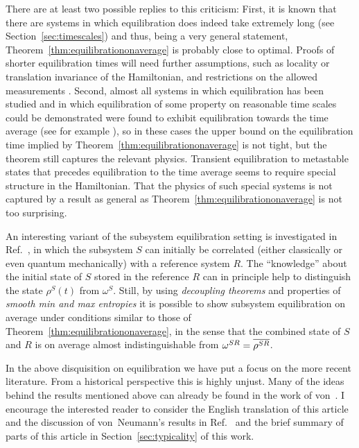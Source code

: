 \documentclass[a4paper,12pt,listof=totoc,index=totoc,bibliography=totoc,headsepline=false,headings=normal,BCOR16.153846mm,DIV12,headinclude,twoside,cleardoublepage=empty,numbers=noenddot,final]{scrreprt}
\theoremstyle{mystyle}
\numberwithin{equation}{section}
\numberwithin{figure}{section}
\numberwithin{lemma}{section}
\numberwithin{theorem}{section}
\numberwithin{corollary}{section}
\numberwithin{definition}{section}
\numberwithin{conjecture}{section}
\numberwithin{observation}{section}
\newcommand{\+}{\mkern2mu}
\newcommand{\taverage}[2][]{
  \ifthenelse{\equal{#1}{}}
  {\overline{#2}}
  {\overline{#2}^{#1}}
}
\DeclareMathOperator{\1}{\mathds{1}}
\begin{document}
There are at least two possible replies to this criticism:
First, it is known that there are systems in which equilibration does indeed take extremely long (see Section~\ref{sec:timescales}) and thus, being a very general statement, Theorem~\ref{thm:equilibrationonaverage} is probably close to optimal.
Proofs of shorter equilibration times will need further assumptions, such as locality or translation invariance of the Hamiltonian, and restrictions on the allowed measurements \cite{1110.5759v1,Linden09}.
Second, almost all systems in which equilibration has been studied and in which equilibration of some property on reasonable time scales could be demonstrated were found to exhibit equilibration towards the time average (see for example \cite{Gemmer09,Campos10,Fagotti2012,Rigol11,1110.4690v1,Rigol07,Rigol2006}), so in these cases the upper bound on the equilibration time implied by Theorem~\ref{thm:equilibrationonaverage} is not tight, but the theorem still captures the relevant physics.
Transient equilibration to metastable states that precedes equilibration to the time average seems to require special structure in the Hamiltonian.
That the physics of such special systems is not captured by a result as general as Theorem~\ref{thm:equilibrationonaverage} is not too surprising.

An interesting variant of the subsystem equilibration setting is investigated in Ref.~\cite{MasterThesisHutter}, in which the subsystem $S$ can initially be correlated (either classically or even quantum mechanically) with a reference system $R$.
The ``knowledge'' about the initial state of $S$ stored in the reference $R$ can in principle help to distinguish the state $\rho^S(t)$ from $\omega^S$.
Still, by using \emph{decoupling theorems} \cite{Dupuis2010,1109.4348v1,Szehr2012} and properties of \emph{smooth min and max entropies} \cite{Koenig08,Ciganovic2013} it is possible to show subsystem equilibration on average under conditions similar to those of Theorem~\ref{thm:equilibrationonaverage}, in the sense that the combined state of $S$ and $R$ is on average almost indistinguishable from $\omega^{SR} = \taverage{\rho^{SR}}$.

In the above disquisition on equilibration we have put a focus on the more recent literature.
From a historical perspective this is highly unjust.
Many of the ideas behind the results mentioned above can already be found in the work of von~\textcite{vonneumann1929}.
I encourage the interested reader to consider the English translation \cite{Tumulka2010} of this article and the discussion of von~Neumann's results in Ref.~\cite{0907.0108v1} and the brief summary of parts of this article in Section~\ref{sec:typicality} of this work.
\end{document}
